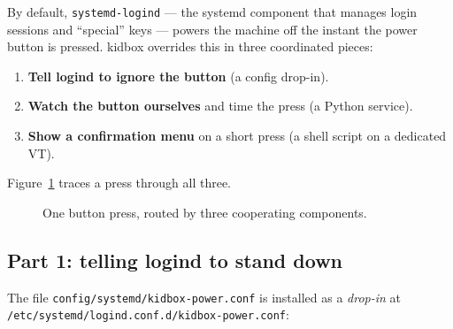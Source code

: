 \documentclass[11pt,oneside]{article}
\newcommand{\code}[1]{\texorpdfstring{\textcolor{kbblue}{\texttt{#1}}}{#1}}
\newcommand{\file}[1]{\textcolor{kbteal}{\texttt{#1}}}
\begin{document}
By default, \texttt{systemd-logind} --- the systemd component that manages login
sessions and ``special'' keys --- powers the machine off the instant the power
button is pressed. kidbox overrides this in three coordinated pieces:

\begin{enumerate}
\item \textbf{Tell logind to ignore the button} (a config drop-in).
\item \textbf{Watch the button ourselves} and time the press (a Python service).
\item \textbf{Show a confirmation menu} on a short press (a shell script on a
dedicated VT).
\end{enumerate}

Figure~\ref{fig:power} traces a press through all three.

\begin{figure}[ht]
\centering
{}
\caption{One button press, routed by three cooperating components.}
\label{fig:power}
\end{figure}

\subsection{Part 1: telling logind to stand down}

The file \file{config/systemd/kidbox-power.conf} is installed as a
\emph{drop-in} at \file{/etc/systemd/logind.conf.d/\allowbreak kidbox-power.conf}:
\end{document}

